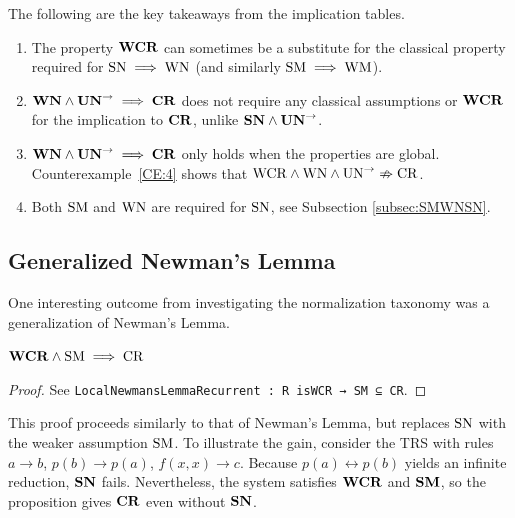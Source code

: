 \begin{remark} The following are the key takeaways from the implication tables. \hfill
    \begin{enumerate}
        \item The property $\mathbf{WCR}$ can sometimes be a substitute for the classical
        property required for $\mathrm{SN} \implies \mathrm{WN}$ (and similarly $\mathrm{SM} \implies \mathrm{WM}$).
        \item $\mathbf{WN} \land \mathbf{UN}^{\to} \implies \mathbf{CR}$ does not require any classical assumptions
         or $\mathbf{WCR}$ for the implication to $\mathbf{CR}$, unlike $\mathbf{SN} \land \mathbf{UN}^{\to}$.
        \item $\mathbf{WN} \land \mathbf{UN}^{\to} \implies \mathbf{CR}$ only holds when the properties are global. Counterexample~\ref{CE:4} shows that $\mathrm{WCR} \land \mathrm{WN} \land \mathrm{UN}^{\to} \nRightarrow \mathrm{CR}$.
        \item Both $\mathrm{SM}$ and $\mathrm{WN}$ are required for $\mathrm{SN}$, see Subsection \ref{subsec:SMWNSN}.
    \end{enumerate}
\end{remark}

\subsection{Generalized Newman's Lemma}\label{subsec:newnewman}
One interesting outcome from investigating the normalization taxonomy was a generalization of Newman's Lemma.

\begin{proposition}
    $\mathbf{WCR} \land \mathrm{SM} \implies \mathrm{CR}$
\end{proposition}
\begin{proof}
    See \verb|LocalNewmansLemmaRecurrent : R isWCR → SM ⊆ CR|.
\end{proof}
This proof proceeds similarly to that of Newman's Lemma, but replaces
$\mathrm{SN}$ with the weaker assumption $\mathrm{SM}$. To illustrate the gain, consider the TRS with rules $a \to b$, $p(b) \to p(a)$, $f(x,x) \to c$. 
Because $p(a) \leftrightarrow p(b)$ yields an infinite reduction, $\mathbf{SN}$ fails. Nevertheless, the system satisfies $\mathbf{WCR}$ and $\mathbf{SM}$, so the proposition gives $\mathbf{CR}$ even without $\mathbf{SN}$.

